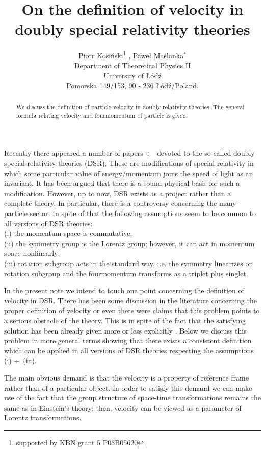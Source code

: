 \documentclass[a4paper,12pt]{article}
\title{On the definition of velocity in doubly special relativity theories }
\author{Piotr Kosi\'nski\thanks{supported by KBN grant 5 P03B05620} , 
 Pawe{\l} Ma\'slanka$^*$ \\
Department of Theoretical Physics II \\
University of {\L}\'od\'z \\
Pomorska 149/153, 90 - 236 {\L}\'od\'z/Poland.}
\date{}
\begin{document}
\maketitle
\begin{abstract}
We discuss the definition of particle velocity in doubly relativity theories. The general formula relating
velocity and fourmomentum of particle is given.
\end{abstract}

\newpage

Recently there appeared a number of papers \cite{b1} $\div $\ \cite{b20} devoted to the so called doubly special relativity
theories (DSR). These are modifications of special relativity in which some particular value of energy/momentum
joins the speed of light as an invariant. It has been argued that there is a sound physical basis for such a modification.
However, up to now, DSR exists as a project rather than a complete theory. In particular, there is a controversy concerning 
the many-particle sector. In spite of that the following assumptions seem to be common to all versions of DSR theories:\\
(i) the momentum space is commutative; \\
(ii) the symmetry group \underline{is} the Lorentz group; 
 however, it can act in momentum space nonlinearly; \\
(iii)  rotation subgroup acts in the standard way, i.e. the symmetry linearizes on rotation subgroup and the fourmomentum 
transforms as a triplet plus singlet.

In the present note we intend to touch one point concerning the definition of velocity in DSR. There has been some
 discussion in the literature concerning the proper definition of velocity \cite{b19} or even there were claims
\cite{b21} that this problem points to a serious obstacle of the theory. This is in spite of the fact that the
satisfying solution has been already given more or less explicitly \cite{b6} \cite{b15}. Below we discuss this problem
in more general terms showing that there exists a consistent definition which can be applied in all versions
of DSR theories respecting the assumptions (i) $\div$\ (iii).

The main obvious demand is that the velocity is a property of reference frame rather than of a particular object.
In order to satisfy this demand we can make use of the fact that the group structure of space-time transformations
remains the same as in Einstein's theory; then, velocity can be viewed as a parameter of Lorentz transformations.
\end{document}
